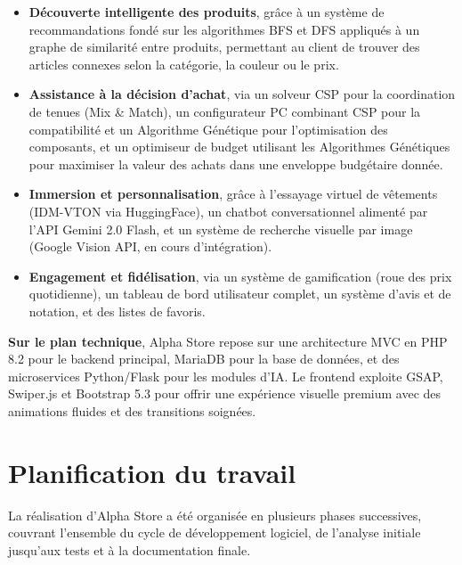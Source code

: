 \begin{itemize}[label=$\bullet$]
    \item \textbf{Découverte intelligente des produits}, grâce à un système de recommandations fondé sur les algorithmes BFS et DFS appliqués à un graphe de similarité entre produits, permettant au client de trouver des articles connexes selon la catégorie, la couleur ou le prix.
    \item \textbf{Assistance à la décision d'achat}, via un solveur CSP pour la coordination de tenues (Mix \& Match), un configurateur PC combinant CSP pour la compatibilité et un Algorithme Génétique pour l'optimisation des composants, et un optimiseur de budget utilisant les Algorithmes Génétiques pour maximiser la valeur des achats dans une enveloppe budgétaire donnée.
    \item \textbf{Immersion et personnalisation}, grâce à l'essayage virtuel de vêtements (IDM-VTON via HuggingFace), un chatbot conversationnel alimenté par l'API Gemini 2.0 Flash, et un système de recherche visuelle par image (Google Vision API, en cours d'intégration).
    \item \textbf{Engagement et fidélisation}, via un système de gamification (roue des prix quotidienne), un tableau de bord utilisateur complet, un système d'avis et de notation, et des listes de favoris.
\end{itemize}

\textbf{Sur le plan technique}, Alpha Store repose sur une architecture MVC en PHP 8.2 pour le backend principal, MariaDB pour la base de données, et des microservices Python/Flask pour les modules d'IA. Le frontend exploite GSAP, Swiper.js et Bootstrap 5.3 pour offrir une expérience visuelle premium avec des animations fluides et des transitions soignées.

\section{Planification du travail}

La réalisation d'Alpha Store a été organisée en plusieurs phases successives, couvrant l'ensemble du cycle de développement logiciel, de l'analyse initiale jusqu'aux tests et à la documentation finale.

